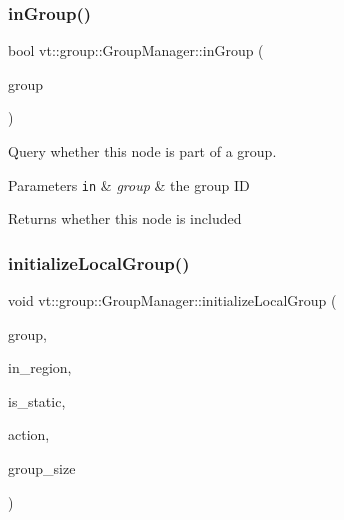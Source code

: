 \subsubsection{\texorpdfstring{in\+Group()}{inGroup()}}
{\footnotesize\ttfamily bool vt\+::group\+::\+Group\+Manager\+::in\+Group (\begin{DoxyParamCaption}\item[{\hyperlink{namespacevt_a27b5e4411c9b6140c49100e050e2f743}{Group\+Type} const \&}]{group }\end{DoxyParamCaption})}



Query whether this node is part of a group. 


\begin{DoxyParams}[1]{Parameters}
\mbox{\tt in}  & {\em group} & the group ID\\
\hline
\end{DoxyParams}
\begin{DoxyReturn}{Returns}
whether this node is included 
\end{DoxyReturn}
\mbox{\label{structvt_1_1group_1_1_group_manager_a8c8c81c05d6afab0fcb357b7ab0b7b1b}} 
\subsubsection{\texorpdfstring{initialize\+Local\+Group()}{initializeLocalGroup()}}
{\footnotesize\ttfamily void vt\+::group\+::\+Group\+Manager\+::initialize\+Local\+Group (\begin{DoxyParamCaption}\item[{\hyperlink{namespacevt_a27b5e4411c9b6140c49100e050e2f743}{Group\+Type} const \&}]{group,  }\item[{\hyperlink{structvt_1_1group_1_1_group_manager_a9192e585fc2f99bfd5a6ff65fc21c40b}{Region\+Ptr\+Type}}]{in\+\_\+region,  }\item[{bool const \&}]{is\+\_\+static,  }\item[{\hyperlink{namespacevt_ae0a5a7b18cc99d7b732cb4d44f46b0f3}{Action\+Type}}]{action,  }\item[{\hyperlink{structvt_1_1group_1_1region_1_1_region_a9bb381adf31111aae34dbc644bad6c1f}{Region\+Type\+::\+Size\+Type} const \&}]{group\+\_\+size }\end{DoxyParamCaption})\hspace{0.3cm}{\ttfamily [private]}}



